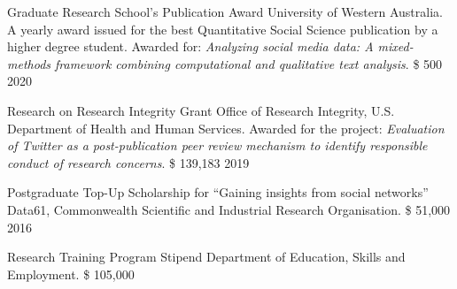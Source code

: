 

\begin{cvhonors}
    \cvhonor
    {Graduate Research School’s Publication Award}
    {University of Western Australia.\linebreak
    A yearly award issued for the best Quantitative Social Science publication by a higher degree student.
    Awarded for: \textit{Analyzing social media data: A mixed-methods framework combining computational and qualitative text analysis}.} %
    {\$ 500} %
    {2020} %

\end{cvhonors}

\begin{cvhonors}
  \cvhonor
    {Research on Research Integrity Grant} %
    {Office of Research Integrity, U.S. Department of Health and Human Services.\linebreak
    Awarded for the project: \textit{Evaluation of Twitter as a post-publication peer review mechanism to identify responsible conduct of research concerns}.
    }
    {\$ 139,183} %
    {2019} %
\end{cvhonors}



\begin{cvhonors}
  \cvhonor
    {Postgraduate Top-Up Scholarship for ``Gaining insights from social networks''} %
    {Data61, Commonwealth Scientific and Industrial Research Organisation.} %
    {\$ 51,000} %
    {2016} %

  \cvhonor
    {Research Training Program Stipend} %
    {Department of Education, Skills and Employment.} %
    {\$ 105,000} %
    {} %

\end{cvhonors}
